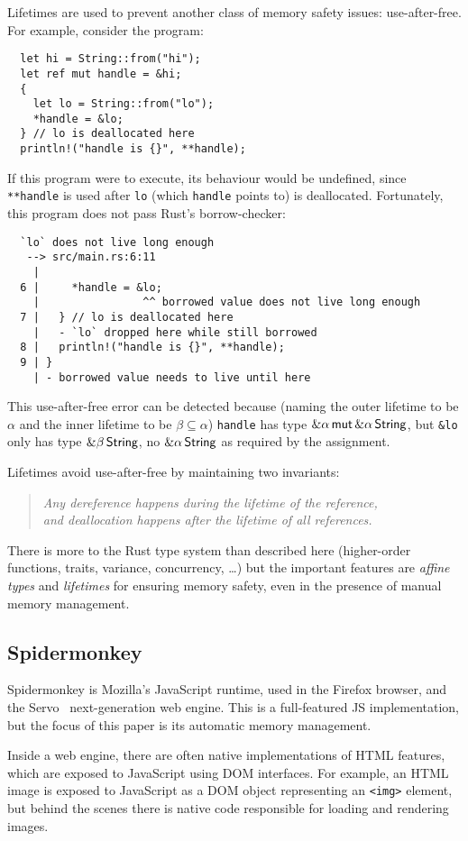 Lifetimes are used to prevent another class of memory safety issues: use-after-free.
For example, consider the program:
\begin{verbatim}
  let hi = String::from("hi");
  let ref mut handle = &hi;
  {
    let lo = String::from("lo");
    *handle = &lo;
  } // lo is deallocated here
  println!("handle is {}", **handle);
\end{verbatim}
If this program were to execute, its behaviour would be undefined,
since \verb|**handle| is used after \verb|lo|
(which \verb|handle| points to) is deallocated. Fortunately, this program
does not pass Rust's borrow-checker:
\begin{verbatim}
  `lo` does not live long enough
   --> src/main.rs:6:11
    |
  6 |     *handle = &lo;
    |                ^^ borrowed value does not live long enough
  7 |   } // lo is deallocated here
    |   - `lo` dropped here while still borrowed
  8 |   println!("handle is {}", **handle);
  9 | }
    | - borrowed value needs to live until here
\end{verbatim}
This use-after-free error can be detected because (naming the outer lifetime to be
$\alpha$ and the inner lifetime to be $\beta\subseteq\alpha$) \verb|handle| has type
$\&\alpha\,\mathsf{mut}\,\&\alpha\,\mathsf{String}$, but \verb|&lo| only has type $\&\beta\,\mathsf{String}$, no
$\&\alpha\,\mathsf{String}$ as required by the assignment.

Lifetimes avoid use-after-free by maintaining two invariants:
\begin{quote}\em
  Any dereference happens during the lifetime of the reference, \\
  and deallocation happens after the lifetime of all references.
\end{quote}
There is more to the Rust type system than described here
(higher-order functions, traits, variance, concurrency, \dots) but the important features
are \emph{affine types} and \emph{lifetimes} for ensuring memory safety,
even in the presence of manual memory management.

\subsection{Spidermonkey}

Spidermonkey is Mozilla's JavaScript runtime, used in the Firefox browser,
and the Servo~\cite{servo} next-generation web engine. This is a full-featured
JS implementation, but the focus of this paper is its automatic memory management.

Inside a web engine, there are often native implementations of HTML features,
which are exposed to JavaScript using DOM interfaces. For example, an HTML image
is exposed to JavaScript as a DOM object representing an \verb|<img>| element,
but behind the scenes there is native code responsible for loading and rendering
images.

